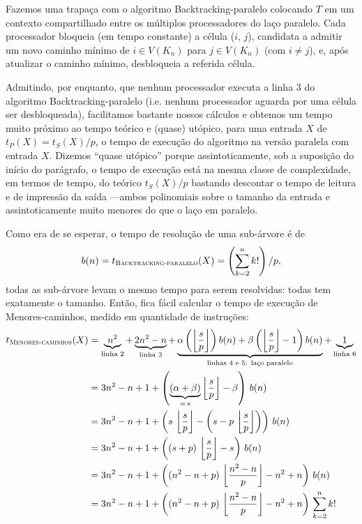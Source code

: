 \documentclass[a4paper,article,10pt]{article}
\newcommand{\parenteses}[1] {\left ( {#1} \right )}
\newcommand{\floor}[1] {\left \lfloor {#1} \right \rfloor}
\newcommand{\floorfrac}[2] {\floor{\frac{#1}{#2}}}
\begin{document}
    Fazemos uma trapaça com o algoritmo {\sc Backtracking-paralelo} colocando
    $T$ em um contexto compartilhado entre os múltiplos processadores do laço
    paralelo.
    Cada processador bloqueia (em tempo constante) a célula ($i$, $j$),
    candidata a admitir um novo caminho mínimo de $i\in V(K_n)$ para $j\in
    V(K_n)$ (com $i\ne j$), e, após atualizar o caminho mínimo, desbloqueia a
    referida célula.

    Admitindo, por enquanto, que nenhum processador executa a linha $3$ do
    algoritmo {\sc Backtracking-paralelo} (i.e. nenhum processador aguarda por
    uma célula ser desbloqueada), facilitamos bastante nossos cálculos e obtemos
    um tempo muito próximo ao tempo teórico e (quase) utópico, para uma entrada
    $X$ de $t_P(X)=t_S(X)/p$, o tempo de execução do algoritmo na versão
    paralela com entrada $X$.
    Dizemos ``quase utópico'' porque assintoticamente, sob a suposição do início
    do parágrafo, o tempo de execução está na mesma classe de complexidade, em
    termos de tempo, do teórico $t_S(X)/p$ bastando descontar o tempo de leitura
    e de impressão da saída ---ambos polinomiais sobre o tamanho da entrada e
    assintoticamente muito menores do que o laço em paralelo.

    Como era de se esperar, o tempo de resolução de uma sub-árvore é de
    \begin{equation*}
      b(n)=t_{\textsc{Backtracking-paralelo}}(X)=\parenteses{\sum_{k=2}^n k!}/p,
    \end{equation*}
    todas as sub-árvore levam o mesmo tempo para serem resolvidas: todas tem
    exatamente o tamanho. Então, fica fácil calcular o tempo de execução de {\sc
      Menores-caminhos}, medido em quantidade de instruções:
    \begin{align*}
      t_{\textsc{Menores-caminhos}}(X) &= 
        \underbrace{n^2}_{\text{\scriptsize linha $2$}} +
        \underbrace{2n^2 - n}_{\text{\scriptsize linha $3$}} +
        \underbrace{\alpha \parenteses{\floorfrac{s}{p}} b(n) + \beta
        \parenteses{\floorfrac{s}{p} - 1} b(n)}_{\text{\scriptsize linhas $4$ e
            $5$: laço paralelo}} +
        \underbrace{1}_{\text{\scriptsize linha $6$}} \\
      &= 3n^2-n+1+\parenteses{\underbrace{(\alpha + \beta)}_{=\,s}
        \floorfrac{s}{p} - \beta}\,b(n) \\
      &= 3n^2 - n + 1 + \parenteses{s\,\floorfrac{s}{p} - \parenteses{s -
            p\,\floorfrac{s}{p}}}\,b(n) \\
      &= 3n^2 - n + 1 + \parenteses{(s+p)\,\floorfrac{s}{p} - s}\,b(n) \\
      &= 3n^2 - n + 1 + \parenteses{(n^2 - n + p)\,\floorfrac{n^2-n}{p} - n^2 +
          n}\,b(n) \\
      &= 3n^2 - n + 1 + \parenteses{(n^2 - n + p)\,\floorfrac{n^2-n}{p} - n^2 +
          n}\,\sum_{k=2}^n k!
    \end{align*}
\end{document}
